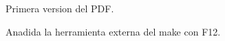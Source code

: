\documentclass{article}
\begin{document}
Primera version del PDF. 

Anadida la herramienta externa del make con F12.
\end{document}
